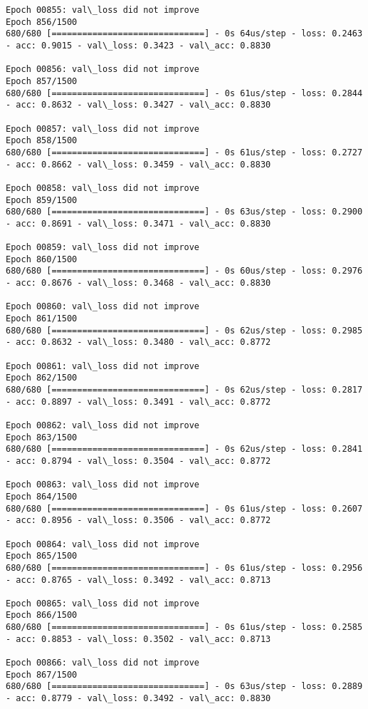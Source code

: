 \documentclass[11pt]{article}
\begin{document}
\begin{Verbatim}[commandchars=\\\{\}]
Epoch 00855: val\_loss did not improve
Epoch 856/1500
680/680 [==============================] - 0s 64us/step - loss: 0.2463 - acc: 0.9015 - val\_loss: 0.3423 - val\_acc: 0.8830

Epoch 00856: val\_loss did not improve
Epoch 857/1500
680/680 [==============================] - 0s 61us/step - loss: 0.2844 - acc: 0.8632 - val\_loss: 0.3427 - val\_acc: 0.8830

Epoch 00857: val\_loss did not improve
Epoch 858/1500
680/680 [==============================] - 0s 61us/step - loss: 0.2727 - acc: 0.8662 - val\_loss: 0.3459 - val\_acc: 0.8830

Epoch 00858: val\_loss did not improve
Epoch 859/1500
680/680 [==============================] - 0s 63us/step - loss: 0.2900 - acc: 0.8691 - val\_loss: 0.3471 - val\_acc: 0.8830

Epoch 00859: val\_loss did not improve
Epoch 860/1500
680/680 [==============================] - 0s 60us/step - loss: 0.2976 - acc: 0.8676 - val\_loss: 0.3468 - val\_acc: 0.8830

Epoch 00860: val\_loss did not improve
Epoch 861/1500
680/680 [==============================] - 0s 62us/step - loss: 0.2985 - acc: 0.8632 - val\_loss: 0.3480 - val\_acc: 0.8772

Epoch 00861: val\_loss did not improve
Epoch 862/1500
680/680 [==============================] - 0s 62us/step - loss: 0.2817 - acc: 0.8897 - val\_loss: 0.3491 - val\_acc: 0.8772

Epoch 00862: val\_loss did not improve
Epoch 863/1500
680/680 [==============================] - 0s 62us/step - loss: 0.2841 - acc: 0.8794 - val\_loss: 0.3504 - val\_acc: 0.8772

Epoch 00863: val\_loss did not improve
Epoch 864/1500
680/680 [==============================] - 0s 61us/step - loss: 0.2607 - acc: 0.8956 - val\_loss: 0.3506 - val\_acc: 0.8772

Epoch 00864: val\_loss did not improve
Epoch 865/1500
680/680 [==============================] - 0s 61us/step - loss: 0.2956 - acc: 0.8765 - val\_loss: 0.3492 - val\_acc: 0.8713

Epoch 00865: val\_loss did not improve
Epoch 866/1500
680/680 [==============================] - 0s 61us/step - loss: 0.2585 - acc: 0.8853 - val\_loss: 0.3502 - val\_acc: 0.8713

Epoch 00866: val\_loss did not improve
Epoch 867/1500
680/680 [==============================] - 0s 63us/step - loss: 0.2889 - acc: 0.8779 - val\_loss: 0.3492 - val\_acc: 0.8830


\end{Verbatim}
\end{document}
